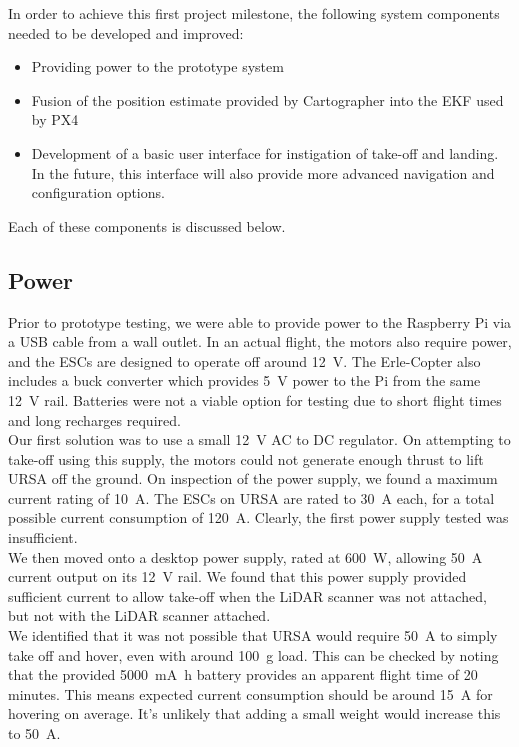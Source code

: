 \documentclass[capstone_report.tex]{subfiles}
\begin{document}
In order to achieve this first project milestone, the following system components needed to be developed and improved:
\begin{itemize}
	\item Providing power to the prototype system
	\item Fusion of the position estimate provided by Cartographer into the EKF used by PX4
	\item Development of a basic user interface for instigation of take-off and landing. In the future, this interface will also provide more advanced navigation and configuration options.
\end{itemize}

Each of these components is discussed below.

\subsection{Power}
Prior to prototype testing, we were able to provide power to the Raspberry Pi via a USB cable from a wall outlet. In an actual flight, the motors also require power, and the ESCs are designed to operate off around \SI{12}{\volt}. The Erle-Copter also includes a buck converter which provides \SI{5}{\volt} power to the Pi from the same \SI{12}{\volt} rail. Batteries were not a viable option for testing due to short flight times and long recharges required.\\

Our first solution was to use a small \SI{12}{\volt} AC to DC regulator. On attempting to take-off using this supply, the motors could not generate enough thrust to lift URSA off the ground. On inspection of the power supply, we found a maximum current rating of \SI{10}{\ampere}. The ESCs on URSA are rated to \SI{30}{\ampere} each, for a total possible current consumption of \SI{120}{\ampere}. Clearly, the first power supply tested was insufficient. \\

We then moved onto a desktop power supply, rated at \SI{600}{\watt}, allowing \SI{50}{\ampere} current output on its \SI{12}{\volt} rail. We found that this power supply provided sufficient current to allow take-off when the LiDAR scanner was not attached, but not with the LiDAR scanner attached.\\

We identified that it was not possible that URSA would require \SI{50}{\ampere} to simply take off and hover, even with around \SI{100}{\gram} load. This can be checked by noting that the provided \SI{5000}{\milli\ampere\hour} battery provides an apparent flight time of 20 minutes. This means expected current consumption should be around \SI{15}{\ampere} for hovering on average. It's unlikely that adding a small weight would increase this to \SI{50}{\ampere}.\\
\end{document}
